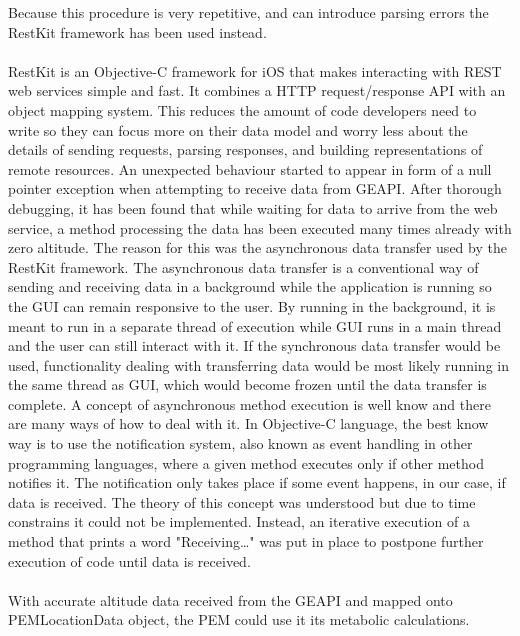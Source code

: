 \documentclass[12pt, a4paper]{report}   %
\begin{document}
\begin{enumerate}
Because this procedure is very repetitive, and can introduce parsing errors the RestKit framework has been used instead.\\ \\


RestKit is an Objective-C framework for iOS that makes interacting with REST web services simple and fast. It combines a HTTP request/response API with an object mapping system. This reduces the amount of code developers need to write so they can focus more on their data model and worry less about the details of sending requests, parsing responses, and building representations of remote resources.
An unexpected behaviour started to appear in form of a null pointer exception when attempting to receive data from GEAPI. After thorough debugging, it has been found that while waiting for data to arrive from the web service, a method processing the data has been executed many times already with zero altitude. The reason for this was the asynchronous data transfer used by the RestKit framework. The asynchronous data transfer is a conventional way of sending and receiving data in a background while the application is running so the GUI can remain responsive to the user. By running in the background, it is meant to run in a separate thread of execution while GUI runs in a main thread and the user can still interact with it. If the synchronous data transfer would be used, functionality dealing with transferring data would be most likely running in the same thread as GUI, which would become frozen until the data transfer is complete. A concept of asynchronous method execution is well know and there are many ways of how to deal with it. In Objective-C language, the best know way is to use the notification system, also known as event handling in other programming languages, where a given method executes only if other method notifies it. The notification only takes place if some event happens, in our case, if data is received. The theory of this concept was understood but due to time constrains it could not be implemented. Instead, an iterative execution of a method that prints a word "Receiving…" was put in place to postpone further execution of code until data is received.\\ \\
With accurate altitude data received from the GEAPI and mapped onto PEMLocationData object, the PEM could use it its metabolic calculations.


\clearpage

\end{enumerate}
\end{document}
